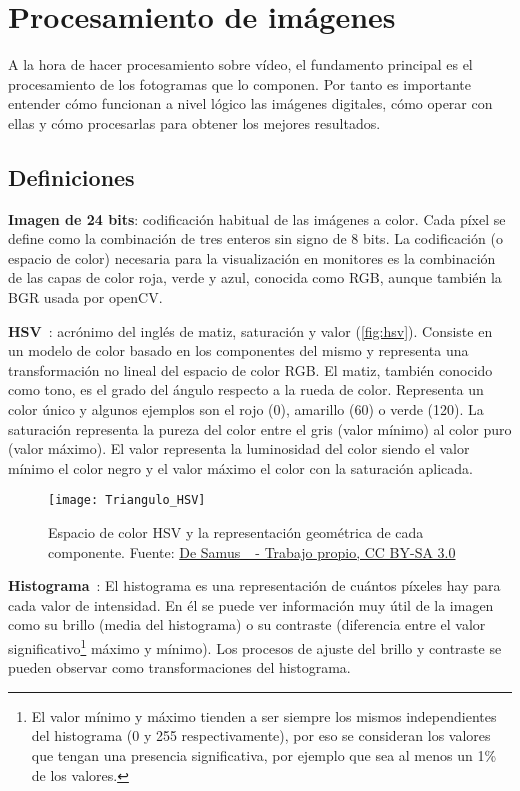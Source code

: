 \section{Procesamiento de imágenes}\label{sec:teccv}

A la hora de hacer procesamiento sobre vídeo, el fundamento principal es el procesamiento de los fotogramas que lo componen. Por tanto es importante entender cómo funcionan a nivel lógico las imágenes digitales, cómo operar con ellas y cómo procesarlas para obtener los mejores resultados.

\subsection{Definiciones}

\textbf{Imagen de 24 bits}: codificación habitual de las imágenes a color. Cada píxel se define como la combinación de tres enteros sin signo de 8 bits. La codificación (o espacio de color) necesaria para la visualización en monitores es la combinación de las capas de color roja, verde y azul, conocida como RGB, aunque también la BGR usada por openCV. 

\textbf{HSV}~\cite{wiki:hsv}: acrónimo del inglés de matiz, saturación y valor (\autoref{fig:hsv}). Consiste en un modelo de color basado en los componentes del mismo y representa una transformación no lineal del espacio de color RGB. El matiz, también conocido como tono, es el grado del ángulo respecto a la rueda de color. Representa un color único y algunos ejemplos son el rojo (0\grado), amarillo (60\grado) o verde (120\grado). La saturación representa la pureza del color entre el gris (valor mínimo) al color puro (valor máximo). El valor representa la luminosidad del color siendo el valor mínimo el color negro y el valor máximo el color con la saturación aplicada.

\begin{figure}
	\centering
	\texttt{[image: Triangulo\_HSV]}
	\caption[Espacio de color HSV y la representación geométrica de cada componente.]{Espacio de color HSV y la representación geométrica de cada componente. Fuente: \href{https://commons.wikimedia.org/w/index.php?curid=1302915}{De Samus\_ - Trabajo propio, CC BY-SA 3.0}}
	\label{fig:hsv}
\end{figure}

\textbf{Histograma}~\cite{garrido2019opencv}: El histograma es una representación de cuántos píxeles hay para cada valor de intensidad. En él se puede ver información muy útil de la imagen como su brillo (media del histograma) o su contraste (diferencia entre el valor significativo\footnote{El valor mínimo y máximo tienden a ser siempre los mismos independientes del histograma (0 y 255 respectivamente), por eso se consideran los valores que tengan una presencia significativa, por ejemplo que sea al menos un 1\% de los valores.} máximo y mínimo). Los procesos de ajuste del brillo y contraste se pueden observar como transformaciones del histograma.

